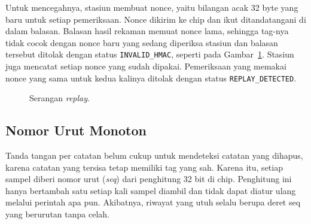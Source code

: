 \documentclass[11pt,a4paper]{article}
\begin{document}
Untuk mencegahnya, stasiun membuat nonce, yaitu bilangan acak 32 byte yang baru untuk setiap
pemeriksaan. Nonce dikirim ke chip dan ikut ditandatangani di dalam balasan. Balasan hasil
rekaman memuat nonce lama, sehingga tag-nya tidak cocok dengan nonce baru yang sedang diperiksa
stasiun dan balasan tersebut ditolak dengan status \texttt{INVALID\_HMAC}, seperti pada
Gambar~\ref{fig:replay}. Stasiun juga mencatat setiap nonce yang sudah dipakai. Pemeriksaan yang
memakai nonce yang sama untuk kedua kalinya ditolak dengan status \texttt{REPLAY\_DETECTED}.

\begin{figure}[H]
  \centering
  \caption{Serangan \textit{replay}.}
  \label{fig:replay}
\end{figure}

\subsection{Nomor Urut Monoton}
\label{subsec:seq}

Tanda tangan per catatan belum cukup untuk mendeteksi catatan yang dihapus, karena catatan yang
tersisa tetap memiliki tag yang sah. Karena itu, setiap sampel diberi nomor urut (\textit{seq})
dari penghitung 32 bit di chip. Penghitung ini hanya bertambah satu setiap kali sampel diambil
dan tidak dapat diatur ulang melalui perintah apa pun. Akibatnya, riwayat yang utuh selalu
berupa deret seq yang berurutan tanpa celah.
\end{document}
